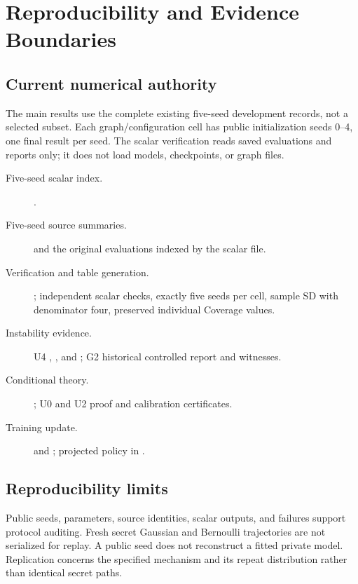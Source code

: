 \chapter{Reproducibility and Evidence Boundaries}\label{app:evidence}
\section{Current numerical authority}
The main results use the complete existing five-seed development records, not a selected subset. Each graph/configuration cell has public initialization seeds 0--4, one final result per seed. The scalar verification reads saved evaluations and reports only; it does not load models, checkpoints, or graph files.

\begingroup\small\raggedright
\begin{description}
\item[Five-seed scalar index.] .
\item[Five-seed source summaries.]  and the original evaluations indexed by the scalar file.
\item[Verification and table generation.] ; independent scalar checks, exactly five seeds per cell, sample SD with denominator four, preserved individual Coverage values.
\item[Instability evidence.] U4 , , and ; G2 historical controlled report and witnesses.
\item[Conditional theory.] ; U0 and U2 proof and calibration certificates.
\item[Training update.]  and ; projected policy in .
\end{description}
\endgroup

\section{Reproducibility limits}
Public seeds, parameters, source identities, scalar outputs, and failures support protocol auditing. Fresh secret Gaussian and Bernoulli trajectories are not serialized for replay. A public seed does not reconstruct a fitted private model. Replication concerns the specified mechanism and its repeat distribution rather than identical secret paths.

